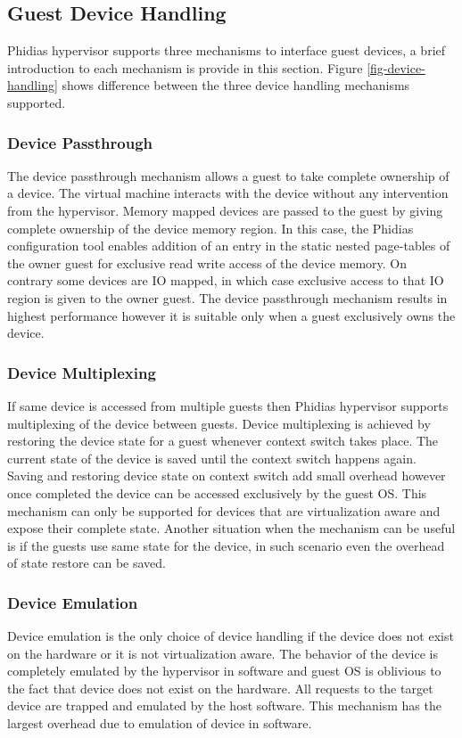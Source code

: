 \subsection{Guest Device Handling} 
Phidias hypervisor supports three mechanisms to interface guest devices, a brief introduction to each mechanism is provide in this section.
Figure \ref{fig-device-handling} shows difference between the three device handling mechanisms supported.


\subsubsection{Device Passthrough}
The device passthrough mechanism allows a guest to take complete ownership of a device. 
The virtual machine interacts with the device without any intervention from the hypervisor.
Memory mapped devices are passed to the guest by giving complete ownership of the device memory region. 
In this case, the Phidias configuration tool enables addition of an entry in the static nested page-tables of the owner guest 
for exclusive read write access of the device memory.
On contrary some devices are IO mapped, in which case exclusive access to that IO region is given to the owner guest.
The device passthrough mechanism results in highest performance however it is suitable only when a guest exclusively owns the device.

\subsubsection{Device Multiplexing}
If same device is accessed from multiple guests then Phidias hypervisor supports multiplexing of the device between guests. 
Device multiplexing is achieved by restoring the device state for a guest whenever context switch takes place. 
The current state of the device is saved until the context switch happens again. 
Saving and restoring device state on context switch add small overhead however once completed the device can be accessed exclusively by the guest OS.
This mechanism can only be supported for devices that are virtualization aware and expose their complete state.
Another situation when the mechanism can be useful is if the guests use same state for the device, in such scenario even the overhead of 
state restore can be saved.

\subsubsection{Device Emulation}
Device emulation is the only choice of device handling if the device does not exist on the hardware or it is not virtualization aware.
The behavior of the device is completely emulated by the hypervisor in software and guest OS is oblivious to the fact that device does not exist on the hardware.
All requests to the target device are trapped and emulated by the host software. This mechanism has the largest overhead due to emulation of device in software.

